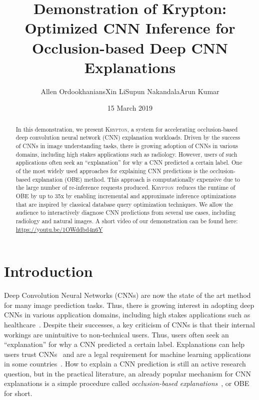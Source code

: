 \documentclass{vldb}
\newcommand{\system}{\textsc{Krypton}}
\begin{document}
\title{Demonstration of Krypton: Optimized CNN Inference for Occlusion-based Deep CNN Explanations}


\author{
\alignauthor Allen Ordookhanians\hspace{10mm}Xin Li\hspace{10mm}Supun Nakandala\hspace{10mm}Arun Kumar\\
}

\date{15 March 2019}


\maketitle

\begin{abstract}
In this demonstration, we present \system, a system for accelerating occlusion-based deep convolution neural network (CNN) explanation workloads.
Driven by the success of CNNs in image understanding tasks, there is growing adoption of CNNs in various domains, including high stakes applications such as radiology.
However, users of such applications often seek an ``explanation'' for why a CNN predicted a certain label.
One of the most widely used approaches for explaining CNN predictions is the occlusion-based explanation (OBE) method.
This approach is computationally expensive due to the large number of re-inference requests produced.
\system~reduces the runtime of OBE by up to 35x by enabling incremental and approximate inference optimizations that are inspired by classical database query optimization techniques.
We allow the audience to interactively diagnose CNN predictions from several use cases, including radiology and natural images.
A short video of our demonstration can be found here: \url{https://youtu.be/1OWddbd4n6Y}
\end{abstract}


\section{Introduction}\label{introduction}
Deep Convolution Neural Networks (CNNs) are now the state of the art method for many image prediction tasks. Thus, there is growing interest in adopting deep CNNs in various application domains, including high stakes applications such as healthcare~\cite{fdaretinopathy,kermany2018identifying}.
Despite their successes, a key criticism of CNNs is that their internal workings are unintuitive to non-technical users. Thus, users often seek an ``explanation'' for why a CNN predicted a certain label. Explanations can help users trust CNNs~\cite{ribeiro2016should} and are a legal requirement for machine learning applications in some countries~\cite{gdpr}. How to explain a CNN prediction is still an active research question, but in the practical literature, an already popular mechanism for CNN explanations is a simple procedure called \textit{occlusion-based explanations}~\cite{zeiler2014visualizing}, or OBE for short.
\end{document}
